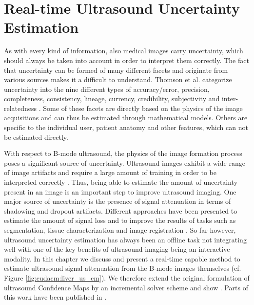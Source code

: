 %

\chapter{Real-time Ultrasound Uncertainty Estimation}
\label{chap:cudacm}

As with every kind of information, also medical images carry uncertainty, which should always be taken into account in order to interpret them correctly.
The fact that uncertainty can be formed of many different facets and originate from various sources makes it a difficult  to understand.
Thomson et al. categorize uncertainty into the nine different types of accuracy/error, precision, completeness, consistency, lineage, currency, credibility, subjectivity and inter-relatedness \cite{Thomson:2005:UncertaintyTopology}.
Some of these facets are directly based on the physics of the image acquisitions and can thus be estimated through mathematical models. 
Others are specific to the individual user, patient anatomy and other features, which can not be estimated directly.


With respect to B-mode ultrasound, the physics of the image formation process poses a significant source of uncertainty.
Ultrasound images exhibit a wide range of image artifacts and require a large amount of training in order to be interpreted correctly \cite{Aldrich:2007:USPhysics,Scanlan:1991:Artifacts}.
Thus, being able to estimate the amount of uncertainty present in an image is an important step to improve ultrasound imaging.
One major source of uncertainty is the presence of signal attenuation in terms of shadowing and dropout artifacts.
Different approaches have been presented to estimate the amount of signal loss and  to improve the results of tasks such as segmentation, tissue characterization and image registration \cite{Noble:2010:Ultrasound, Noble:2011:Ultrasound}.
So far however, ultrasound uncertainty estimation has always been an offline task not integrating well with one of the key benefits of ultrasound imaging  being an interactive modality.
In this chapter we discuss and present a real-time capable method to estimate ultrasound signal attenuation from the B-mode images themselves (cf. Figure \ref{fig:cudacm:liver_us_cm}).
We therefore extend the original formulation of ultrasound Confidence Maps \cite{Karamalis:2012:ConfidenceMaps} by an incremental solver scheme and show .
Parts of this work have been published in \CN.

